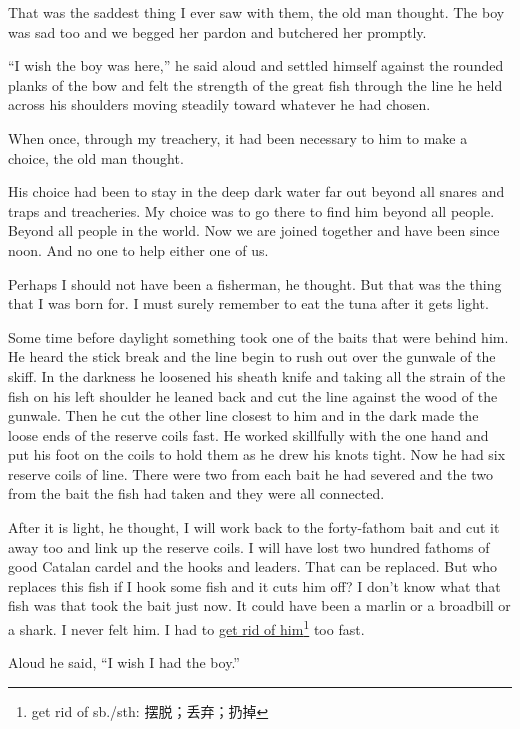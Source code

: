 \documentclass[fontset=ubuntu]{ctexrep}
\begin{document}
That was the saddest thing I ever saw with them, the old man thought. The
boy was sad too and we begged her pardon and butchered her \gls{promptly}.

``I wish the boy was here,'' he said aloud and \gls{settled} himself against
the rounded planks of the bow and felt the strength of the great fish
through the line he held across his shoulders moving steadily toward
whatever he had chosen.

When once, through my \gls{treachery}, it had been necessary to him to make a
choice, the old man thought.

His choice had been to stay in the deep dark water far out \gls{beyond} all
\glspl{snare} and \glspl{trap} and treacheries. My choice was to go
there to find him beyond all people. Beyond all people in the world. Now we
are joined together and have been since noon. And no one to help \gls{either} one
of us.

Perhaps I should not have been a fisherman, he thought. But that was the
thing that I was born for. I must surely remember to eat the tuna after it
gets light.

Some time before daylight something took one of the baits that were behind
him. He heard the stick break and the line begin to rush out over the
\gls{gunwale} of the skiff. In the darkness he \gls{loosened} his
\gls{sheath} knife and taking all the strain of the fish on his left
shoulder he leaned back and cut the line against the wood of the gunwale.
Then he cut the other line closest to him and in the dark made the
\gls{loose} ends of the reserve coils fast. He worked \gls{skillfully} with
the one hand and put his foot on the coils to hold them as he \gls{drew} his
\glspl{knot} tight. Now he had six reserve coils of line. There were two
from each bait he had severed and the two from the bait the fish had taken
and they were all connected.

After it is light, he thought, I will work back to the forty-fathom bait and
cut it away too and link up the reserve coils. I will have lost two hundred
fathoms of good Catalan cardel and the hooks and leaders. That can be
replaced. But who replaces this fish if I hook some fish and it cuts him
off? I don't know what that fish was that took the bait just now. It could
have been a marlin or a broadbill or a shark. I never felt him. I had to \uline{get
rid of him}\footnote{get rid of sb./sth: 摆脱；丢弃；扔掉} too fast.

Aloud he said, ``I wish I had the boy.''
\end{document}
